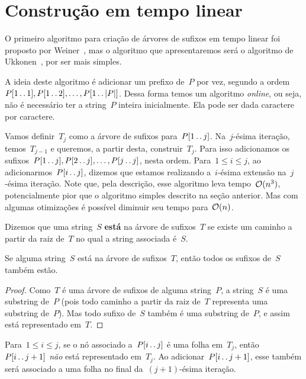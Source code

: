 \section{Construção em tempo linear}
\label{sec:sufftreelin}

O primeiro algoritmo para criação de árvores de sufixos em tempo linear foi proposto por Weiner~\cite{weiner}, mas o algoritmo que apresentaremos será o algoritmo de Ukkonen~\cite{ukkonen}, por ser mais simples.


A ideia deste algoritmo é adicionar um prefixo de~$P$ por vez, segundo a ordem~$P[1\,.\,.\, 1], P[1\,.\,.\, 2], \ldots, P[1\,.\,.\, |P|]$. Dessa forma temos um algoritmo \emph{online}, ou seja, não é necessário ter a string~$P$ inteira inicialmente. Ela pode ser dada caractere por caractere.

Vamos definir~$T_j$ como a árvore de sufixos para~$P[1\,.\,.\, j]$.
Na~$j$-ésima iteração, temos~$T_{j-1}$ e queremos, a partir desta, construir~$T_j$. Para isso adicionamos os sufixos~$P[1\,.\,.\, j], P[2\,.\,.\, j], \ldots, P[j\,.\,.\, j]$, nesta ordem. Para~$1 \leq i \leq j$, ao adicionarmos~$P[i\,.\,.\, j]$, dizemos que estamos realizando a~$i$-ésima extensão na~$j$-ésima iteração. Note que, pela descrição, esse algoritmo leva tempo~$\mathcal{O}(n^3)$, potencialmente pior que o algoritmo simples descrito na seção anterior. Mas com algumas otimizações é possível diminuir seu tempo para~$\mathcal{O}(n)$.

\begin{definition}
Dizemos que uma string~$S$ \textbf{está} na árvore de sufixos~$T$ se existe um caminho a partir da raiz de~$T$ no qual a string associada é~$S$.
\end{definition}

\begin{lemma}
\label{lem:caso1}
Se alguma string~$S$ está na árvore de sufixos~$T$, então todos os sufixos de~$S$ também estão.
\end{lemma}

\begin{proof}
Como~$T$ é uma árvore de sufixos de alguma string~$P$, a string~$S$ é uma substring de~$P$ (pois todo caminho a partir da raiz de~$T$ representa uma substring de~$P$). Mas todo sufixo de~$S$ também é uma substring de~$P$, e assim está representado em~$T$.
\end{proof}

\begin{lemma}
\label{lem:caso4}
Para~$1 \leq i \leq j$, se o nó associado a~$P[i\,.\,.\, j]$ é uma folha em~$T_j$, então~$P[i\,.\,.\, j+1]$ \emph{não} está representado em~$T_j$. Ao adicionar~$P[i\,.\,.\, j+1]$, esse também será associado a uma folha no final da~$(j+1)$-ésima iteração.
\end{lemma}

